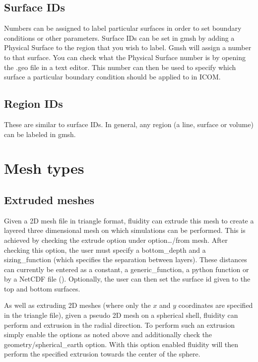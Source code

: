\subsection{Surface IDs}\label{sect:surface_ids}
Numbers can be assigned to label particular surfaces in order to set boundary conditions or other parameters.  Surface IDs can be set in gmsh by adding a Physical Surface to the region that you wish to label.  Gmsh will assign a number to that surface.  You can check what the Physical Surface number is by opening the .geo file in a text editor.  This number can then be used to specify which surface a particular boundary condition should be applied to in ICOM.

\subsection{Region IDs}\label{sect:region_ids}
These are similar to surface IDs. In general, any region (a line, surface or volume) can be labeled in gmsh.

\section{Mesh types}
\subsection{Extruded meshes}
\label{sect:extruded_meshes}

Given a 2D mesh file in triangle format, fluidity can extrude this mesh to create a layered three dimensional mesh on which simulations can be performed. This is achieved
by checking the extrude option under option{\ldots/from mesh}. After checking this option, the user must specify a bottom\_depth and a sizing\_function (which specifies the separation
between layers). These distances can currently be entered as a constant, a generic\_function, a python function or by a NetCDF file (\website). Optionally, the user can then set the surface id given to the top and bottom surfaces. 

As well as extruding 2D meshes (where only the $x$ and $y$ coordinates are specified in the triangle file), given a pseudo 2D mesh on a spherical shell, fluidity can perform
and extrusion in the radial direction. To perform such an extrusion simply enable the options as noted above and additionally check the geometry/spherical\_earth option. With
this option enabled fluidity will then perform the specified extrusion towards the center of the sphere.

